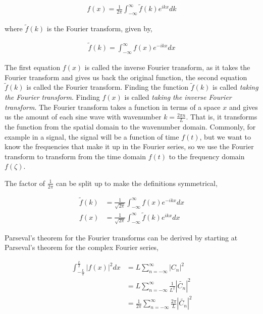 \documentclass[11pt]{amsart}
\begin{document}
\begin{align*}
  f(x) = \frac{1}{2\pi}\int_{-\infty}^{\infty}\tilde{f}(k)e^{ikx} dk
\end{align*}

where $\tilde{f}(k)$ is the Fourier transform, given by,

\begin{align*}
  \tilde{f}(k) = \int_{-\infty}^{\infty}f(x) e^{-ikx} dx
\end{align*}

The first equation $f(x)$ is called the inverse Fourier transform, as it takes the Fourier transform and gives us back the original function, the second equation $\tilde{f}(k)$ is called the Fourier transform. Finding the function $\tilde{f}(k)$ is called \textit{taking the Fourier transform}. Finding $f(x)$ is called \textit{taking the inverse Fourier transform}. The Fourier transform takes a function in terms of a space $x$ and gives us the amount of each sine wave with wavenumber $k = \frac{2\pi n}{L}$. That is, it transforms the function from the spatial domain to the wavenumber domain. Commonly, for example in a signal, the signal will be a function of time $f(t)$, but we want to know the frequencies that make it up in the Fourier series, so we use the Fourier transform to transform from the time domain $f(t)$ to the frequency domain $f(\zeta)$.

The factor of $\frac{1}{2\pi}$ can be split up to make the definitions symmetrical,

\begin{align*}
  \tilde{f}(k) &= \frac{1}{\sqrt{2\pi}}\int_{-\infty}^{\infty}f(x)e^{-ikx} dx \\
  f(x) &= \frac{1}{\sqrt{2\pi}}\int_{-\infty}^{\infty}\tilde{f}(k)e^{ikx} dx
\end{align*}

Parseval's theorem for the Fourier transforms can be derived by starting at Parseval's theorem for the complex Fourier series,

\begin{align*}
  \int_{-\frac{L}{2}}^{\frac{L}{2}}{|f(x)|}^2 dx &= L\sum\limits_{n=-\infty}^{\infty}{|C_n|}^2 \\
                                                 &= L\sum\limits_{n=-\infty}^{\infty}\frac{1}{L^2}{|\tilde{C_n}|}^2 \\
                                                 &= \frac{1}{2\pi}\sum\limits_{n=-\infty}^{\infty}\frac{2\pi}{L}{|\tilde{C_n}|}^2
\end{align*}
\end{document}
